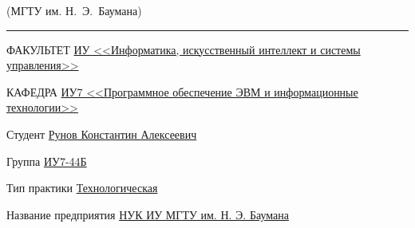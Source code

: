 \begin{titlepage}
\begin{center}
{\begin{minipage}{0.80\textwidth}
{                    {(МГТУ им. Н.~Э.~Баумана)}
                }
            \end{minipage}
        }

        \vspace{0.2cm}
        \rule{\linewidth}{3.4pt}

        \begin{flushleft}
            {ФАКУЛЬТЕТ \uline{ИУ <<Информатика, искусственный интеллект и системы управления>> \hfill}}

            \vspace{0.5cm}

            {КАФЕДРА \uline{ИУ7 <<Программное обеспечение ЭВМ и информационные технологии>> \hfill}}
        \end{flushleft}


        {
            \Large{\textbf{}}

            \vspace{0.5cm}
        }

        \vspace{0.5cm}


        \fontsize{14pt}{14pt}\selectfont

        \begin{flushleft}
            {Студент \uline{Рунов Константин Алексеевич \hfill}}

            \vspace{0.5cm}

            {Группа \uline{ИУ7-44Б \hfill}}

            \vspace{0.5cm}

            {Тип практики \uline{Технологическая \hfill}}

            \vspace{0.5cm}

            {Название предприятия \uline{НУК ИУ МГТУ им. Н. Э. Баумана\hfill}}
        \end{flushleft}


\end{center}
\end{titlepage}
